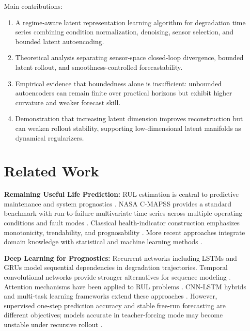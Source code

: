 \documentclass[letterpaper]{article}
\begin{document}
Main contributions:
\begin{enumerate}
\item A regime-aware latent representation learning algorithm for degradation time series combining condition normalization, denoising, sensor selection, and bounded latent autoencoding.
\item Theoretical analysis separating sensor-space closed-loop divergence, bounded latent rollout, and smoothness-controlled forecastability.
\item Empirical evidence that boundedness alone is insufficient: unbounded autoencoders can remain finite over practical horizons but exhibit higher curvature and weaker forecast skill.
\item Demonstration that increasing latent dimension improves reconstruction but can weaken rollout stability, supporting low-dimensional latent manifolds as dynamical regularizers.
\end{enumerate}

\section{Related Work}

\textbf{Remaining Useful Life Prediction:} RUL estimation is central to predictive maintenance and system prognostics \cite{si2011remaining,zio2016prognostics}. NASA C-MAPSS provides a standard benchmark with run-to-failure multivariate time series across multiple operating conditions and fault modes \cite{nasa_cmapss,saxena2008damage}. Classical health-indicator construction emphasizes monotonicity, trendability, and prognosability \cite{coble2009identifying,wang2004residual}. More recent approaches integrate domain knowledge with statistical and machine learning methods \cite{lei2018application}.

\textbf{Deep Learning for Prognostics:} Recurrent networks including LSTMs \cite{hochreiter1997lstm,zheng2017lstm} and GRUs \cite{cho2014gru} model sequential dependencies in degradation trajectories. Temporal convolutional networks provide stronger alternatives for sequence modeling \cite{bai2018tcn,sen2019think}. Attention mechanisms have been applied to RUL problems \cite{wang2020attention,xu2020remaining}. CNN-LSTM hybrids and multi-task learning frameworks extend these approaches \cite{li2019deep,ragab2021attention}. However, supervised one-step prediction accuracy and stable free-run forecasting are different objectives; models accurate in teacher-forcing mode may become unstable under recursive rollout \cite{torres2021deep}.
\end{document}
